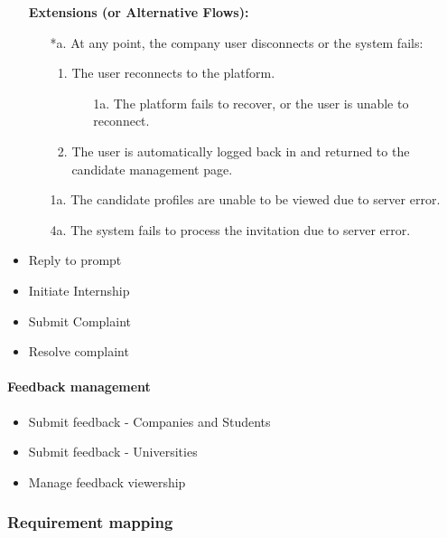\begin{itemize}[label={[\textbf{UC}]}, align=left, leftmargin=*]
    \textbf{Extensions (or Alternative Flows):} 
    \begin{enumerate}[label=\arabic*.]
        \item[*a.] At any point, the company user disconnects or the system fails:
            \begin{enumerate}[label=\arabic*.]
                \item The user reconnects to the platform.
                    \begin{enumerate}[label=\alph*.]
                        \item[1a.] The platform fails to recover, or the user is unable to reconnect.
                    \end{enumerate}
                 \item The user is automatically logged back in and returned to the candidate management page.
            \end{enumerate}
        \item[1a.] The candidate profiles are unable to be viewed due to server error. 
        \item[4a.] The system fails to process the invitation due to server error.
        \end{enumerate}


    \item {} Reply to prompt
    \item {} Initiate Internship
    \item {} Submit Complaint
    \item {} Resolve complaint
\end{itemize}

\paragraph{Feedback management}
\begin{itemize}[label={[\textbf{UC}]}, align=left, leftmargin=*]
    \item {} Submit feedback - Companies and Students
    \item {} Submit feedback - Universities
    \item {} Manage feedback viewership

\end{itemize}



\subsubsection{Requirement mapping}


